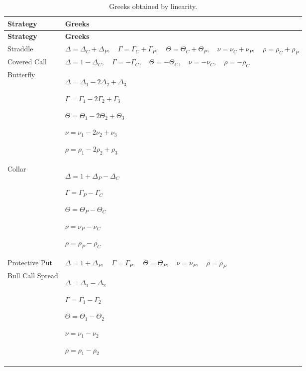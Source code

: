 \documentclass[11pt]{article}
\begin{document}


\begin{center}
\small
\begin{longtable}{p{3cm} p{11cm}}
\toprule
\textbf{Strategy} & \textbf{Greeks} \\
\midrule
\endfirsthead

\toprule
\textbf{Strategy} & \textbf{Greeks} \\
\midrule
\endhead

Straddle &
$\Delta=\Delta_C+\Delta_P,\quad
\Gamma=\Gamma_C+\Gamma_P,\quad
\Theta=\Theta_C+\Theta_P,\quad
\nu=\nu_C+\nu_P,\quad
\rho=\rho_C+\rho_P$
\\

Covered Call &
$\Delta=1-\Delta_C,\quad
\Gamma=-\Gamma_C,\quad
\Theta=-\Theta_C,\quad
\nu=-\nu_C,\quad
\rho=-\rho_C$
\\

Butterfly &
$\Delta=\Delta_1-2\Delta_2+\Delta_3$

$\Gamma=\Gamma_1-2\Gamma_2+\Gamma_3$

$\Theta=\Theta_1-2\Theta_2+\Theta_3$

$\nu=\nu_1-2\nu_2+\nu_3$

$\rho=\rho_1-2\rho_2+\rho_3$
\\

Collar &
$\Delta=1+\Delta_P-\Delta_C$

$\Gamma=\Gamma_P-\Gamma_C$

$\Theta=\Theta_P-\Theta_C$

$\nu=\nu_P-\nu_C$

$\rho=\rho_P-\rho_C$
\\

Protective Put &
$\Delta=1+\Delta_P,\quad
\Gamma=\Gamma_P,\quad
\Theta=\Theta_P,\quad
\nu=\nu_P,\quad
\rho=\rho_P$
\\

Bull Call Spread &
$\Delta=\Delta_1-\Delta_2$

$\Gamma=\Gamma_1-\Gamma_2$

$\Theta=\Theta_1-\Theta_2$

$\nu=\nu_1-\nu_2$

$\rho=\rho_1-\rho_2$
\\

\bottomrule
\caption{Greeks obtained by linearity.}
\end{longtable}
\end{center}

\newpage
\end{document}
